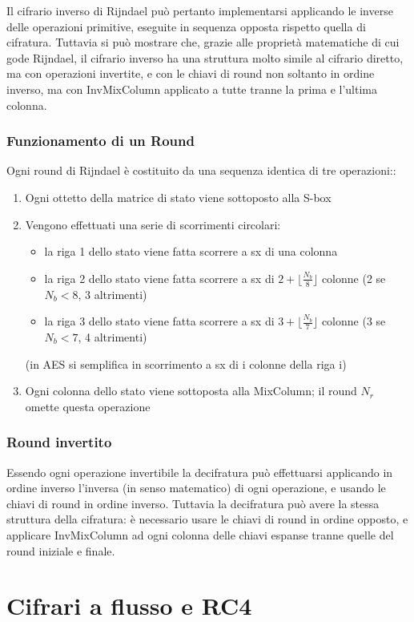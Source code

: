Il cifrario inverso di Rijndael può pertanto implementarsi applicando le inverse delle operazioni primitive, eseguite in sequenza opposta rispetto quella di cifratura. Tuttavia si può mostrare che, grazie alle proprietà matematiche di cui gode Rijndael, il cifrario inverso ha una struttura molto simile al cifrario diretto, ma con operazioni invertite, e con le chiavi di round non soltanto in ordine inverso, ma con InvMixColumn applicato a tutte tranne la prima e l'ultima colonna.

\subsubsection{Funzionamento di un Round}
Ogni round di Rijndael è costituito da una sequenza identica di tre operazioni::
\begin{enumerate}
  \item Ogni ottetto della matrice di stato viene sottoposto alla S-box
  \item Vengono effettuati una serie di scorrimenti circolari:
  		\begin{itemize}
  			\item la riga 1 dello stato viene fatta scorrere a sx di una colonna
  			\item la riga 2 dello stato viene fatta scorrere a sx di $2 + \lfloor \frac{N_{b}}{8} \rfloor$ colonne (2 se $N_{b} < 8$, 3 altrimenti)
  			\item la riga 3 dello stato viene fatta scorrere a sx di $3 + \lfloor \frac{N_{b}}{7} \rfloor$ colonne (3 se $N_{b} < 7$, 4 altrimenti)
		\end{itemize}
		(in AES si semplifica in scorrimento a sx di i colonne della riga i)
  \item Ogni colonna dello stato viene sottoposta alla MixColumn; il round $N_{r}$ omette questa operazione
\end{enumerate}

\subsubsection{Round invertito}
Essendo ogni operazione invertibile la decifratura può effettuarsi applicando in ordine inverso l'inversa (in senso matematico) di ogni operazione, e usando le chiavi di round in ordine inverso. Tuttavia la decifratura può avere la stessa struttura della cifratura: è necessario usare le chiavi di round in ordine opposto, e applicare InvMixColumn ad ogni colonna delle chiavi espanse tranne quelle del round iniziale e finale.

\section{Cifrari a flusso e RC4}